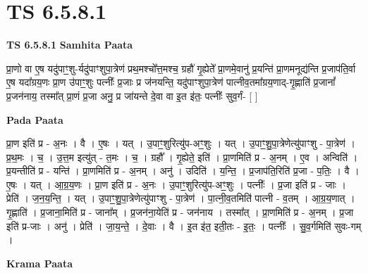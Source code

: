 \documentclass[17pt]{extarticle}
\begin{document}
\section{ TS 6.5.8.1 }

\textbf{TS 6.5.8.1 } \newline
\textbf{Samhita Paata} \newline

प्रा॒णो वा ए॒ष यदु॑पाꣳ॒॒शु-र्यदु॑पाꣳशुपा॒त्रेण॑ प्रथ॒मश्चो᳚त्त॒मश्च॒ ग्रहौ॑ गृ॒ह्येते᳚ प्रा॒णमे॒वानु॑ प्र॒यन्ति॑ प्रा॒णमनूद्य॑न्ति प्र॒जाप॑ति॒र्वा ए॒ष यदा᳚ग्रय॒णः प्रा॒ण उ॑पाꣳ॒॒शुः पत्नीः᳚ प्र॒जाः प्र ज॑नयन्ति॒ यदु॑पाꣳशुपा॒त्रेण॑ पात्नीव॒तमा᳚ग्रय॒णाद्-गृ॒ह्णाति॑ प्र॒जानां᳚ प्र॒जन॑नाय॒ तस्मा᳚त् प्रा॒णं प्र॒जा अनु॒ प्र जा॑यन्ते दे॒वा वा इ॒त इ॑तः॒ पत्नीः᳚ सुव॒र्गं- [  ] \newline

\textbf{Pada Paata} \newline

प्रा॒ण इति॑ प्र - अ॒नः । वै । ए॒षः । यत् । उ॒पाꣳ॒॒शुरित्यु॑प-अꣳ॒॒शुः । यत् । उ॒पाꣳ॒॒शु॒पा॒त्रेणेत्यु॑पाꣳशु - पा॒त्रेण॑ । प्र॒थ॒मः । च॒ । उ॒त्त॒म इत्यु॑त् - त॒मः । च॒ । ग्रहौ᳚ । गृ॒ह्येते॒ इति॑ । प्रा॒णमिति॑ प्र - अ॒नम् । ए॒व । अन्विति॑ । प्र॒यन्तीति॑ प्र - यन्ति॑ । प्रा॒णमिति॑ प्र - अ॒नम् । अनु॑ । उदिति॑ । य॒न्ति॒ । प्र॒जाप॑ति॒रिति॑ प्र॒जा - प॒तिः॒ । वै । ए॒षः । यत् । आ॒ग्र॒य॒णः । प्रा॒ण इति॑ प्र - अ॒नः । उ॒पाꣳ॒॒शुरित्यु॑प-अꣳ॒॒शुः । पत्नीः᳚ । प्र॒जा इति॑ प्र - जाः । प्रेति॑ । ज॒न॒य॒न्ति॒ । यत् । उ॒पाꣳ॒॒शु॒पा॒त्रेणेत्यु॑पाꣳशु - पा॒त्रेण॑ । पा॒त्नी॒व॒तमिति॑ पात्नी - व॒तम् । आ॒ग्र॒य॒णात् । गृ॒ह्णाति॑ । प्र॒जाना॒मिति॑ प्र - जाना᳚म् । प्र॒जन॑ना॒येति॑ प्र - जन॑नाय । तस्मा᳚त् । प्रा॒णमिति॑ प्र - अ॒नम् । प्र॒जा इति॑ प्र-जाः । अनु॑ । प्रेति॑ । जा॒य॒न्ते॒ । दे॒वाः । वै । इ॒त इ॑त॒ इती॒तः - इ॒तः॒ । पत्नीः᳚ । सु॒व॒र्गमिति॑ सुवः-गम् ।  \newline


\textbf{Krama Paata} \newline
\end{document}
